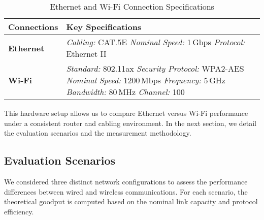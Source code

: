         \begin{table}[ht]
            \small
            \centering
            \begin{tabular}{@{}l p{}@{}}
            \toprule
            \textbf{Connections} & \textbf{Key Specifications} \\
            \midrule
            \textbf{Ethernet} 
                & \textit{Cabling:}     CAT.5E \newline
                \textit{Nominal Speed:} 1\,Gbps    \hspace{2em}    \textit{Protocol:} Ethernet II \\ %
            \midrule
            \textbf{Wi-Fi} 
                & \textit{Standard:}    802.11ax   \hspace{3.6em}  \textit{Security Protocol:} WPA2-AES \newline %
                \textit{Nominal Speed:} 1200\,Mbps \hspace{0.5em}  \textit{Frequency:} 5\,GHz \newline %
                \textit{Bandwidth:}     80\,MHz    \hspace{3.25em} \textit{Channel:} 100 \\ %
            \bottomrule
            \end{tabular}
            \vspace{0.5cm}
            \caption{Ethernet and Wi-Fi Connection Specifications}
            \label{tab:connection-specs}
        \end{table}


        This hardware setup allows us to compare Ethernet versus Wi-Fi performance under a consistent router and cabling environment. 
        In the next section, we detail the evaluation scenarios and the measurement methodology.

    \subsection{Evaluation Scenarios} \label{subsec:evaluation-scenarios}

        We considered three distinct network configurations to assess the performance differences between wired and wireless communications. 
        For each scenario, the theoretical goodput is computed based on the nominal link capacity and protocol efficiency.

